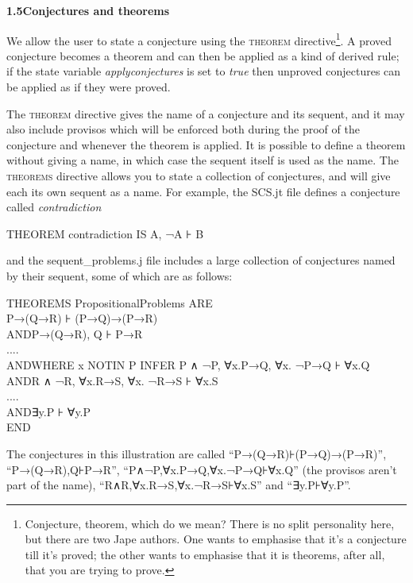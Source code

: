 \documentclass[11pt]{book}
\newcommand{\tab}{\hspace{5mm}}
\begin{document}
\textbf{{\large 1.5\tab Conjectures and theorems}}


We allow the user to state a conjecture using the \textsc{theorem} directive\footnote{Conjecture, theorem, which do we mean? There is no split personality here, but there are two Jape authors. One wants to emphasise that it's a conjecture till it's proved; the other wants to emphasise that it is theorems, after all, that you are trying to prove.}. A proved conjecture becomes a theorem and can then be applied as a kind of derived rule; if the state variable \textit{applyconjectures} is set to \textit{true} then unproved conjectures can be applied as if they were proved.


The \textsc{theorem} directive gives the name of a conjecture and its sequent, and it may also include provisos which will be enforced both during the proof of the conjecture and whenever the theorem is applied. It is possible to define a theorem without giving a name, in which case the sequent itself is used as the name. The \textsc{theorems} directive allows you to state a collection of conjectures, and will give each its own sequent as a name. For example, the SCS.jt file defines a conjecture called \textit{contradiction}

THEOREM contradiction IS A, ¬A ⊦ B


and the sequent\_problems.j file includes a large collection of conjectures named by their sequent, some of which are as follows:

THEOREMS PropositionalProblems ARE\\
\tab P→(Q→R) ⊦ (P→Q)→(P→R)\\
AND\tab P→(Q→R), Q ⊦ P→R\\
\tab ....\\
AND\tab WHERE x NOTIN P INFER P ∧ ¬P, ∀x.P→Q, ∀x. ¬P→Q ⊦ ∀x.Q \\
AND\tab R ∧ ¬R, ∀x.R→S, ∀x. ¬R→S ⊦ ∀x.S\\
....\\
AND\tab ∃y.P ⊦ ∀y.P\\
END


The conjectures in this illustration are called ``P→(Q→R){\nobreakspace}⊦{\nobreakspace}(P→Q)→(P→R)'', ``P→(Q→R),{\nobreakspace}Q{\nobreakspace}⊦{\nobreakspace}P→R'', ``P∧¬P,{\nobreakspace}∀x.P→Q,{\nobreakspace}∀x.¬P→Q{\nobreakspace}⊦{\nobreakspace}∀x.Q'' (the provisos aren't part of the name), ``R∧{\nobreakspace}R,{\nobreakspace}∀x.R→S,{\nobreakspace}∀x.¬R→S{\nobreakspace}⊦{\nobreakspace}∀x.S'' and ``∃y.P{\nobreakspace}⊦{\nobreakspace}∀y.P''.
\end{document}
